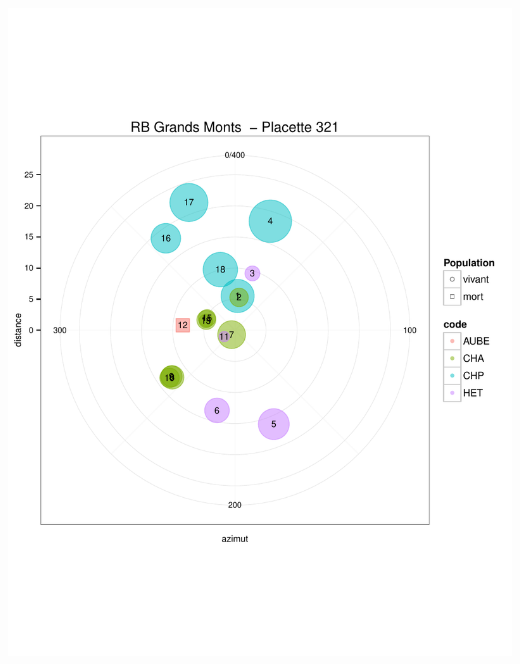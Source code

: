 \documentclass[a4paper]{book}\usepackage[]{graphicx}\usepackage[]{color}
\makeatletter
\def\maxwidth{ %
  \ifdim\Gin@nat@width>\linewidth
    \linewidth
  \else
    \Gin@nat@width
  \fi
}
\newenvironment{knitrout}{}{} %
\makeatother
\begin{document}
\begin{knitrout}
{\centering \includegraphics[width=\maxwidth]{Figures/PlanArbres-30} 

}





\end{knitrout}
\end{document}
